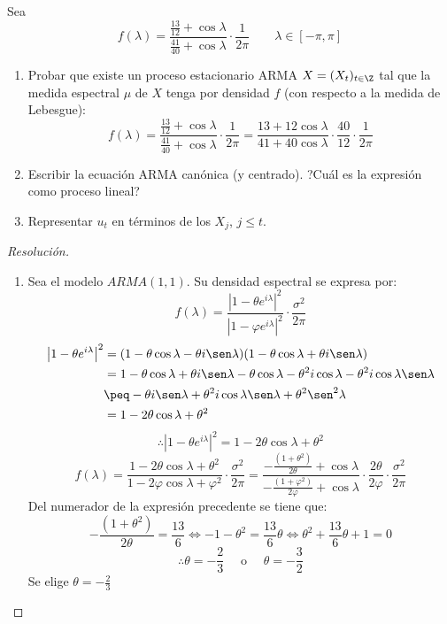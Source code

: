 \begin{ejemplo}
Sea 
\[
 f(\lambda )=\frac{\frac{13}{12}+\cos \lambda }{\frac{41}{40}+\cos 
\lambda }\cdot\frac{1}{2\pi }\qquad \lambda \in \left[ {-\pi ,\pi } 
\right]
\]

\begin{enumerate}
\item Probar que existe un proceso estacionario ARMA $X=(X_{t} )_{t\in \Z} $ tal que la medida espectral $\mu $ de $X$ tenga por densidad $f$ (con respecto a la medida de Lebesgue):
\[
f(\lambda )=\frac{\frac{13}{12}+\cos \lambda }{\frac{41}{40}+\cos \lambda 
}\cdot\frac{1}{2\pi }=\frac{13+12 \cos \lambda }{41+40\cos \lambda }\cdot\frac{40}{12}\cdot\frac{1}{2\pi }
\]

\item Escribir la ecuaci\'{o}n ARMA can\'{o}nica (y centrado). ?Cu\'{a}l es la expresi\'{o}n como proceso lineal?

\item Representar $u_{{t}}$ en t\'{e}rminos de los $X_{j}$, $j\le t$.
\end{enumerate}


\begin{proof}[Resoluci\'{o}n]
\begin{enumerate}
\item Sea el modelo $ARMA(1, 1)$. Su densidad espectral se expresa por:
\[
f(\lambda )=\frac{\left| {1-\theta e^{i\lambda }} \right|^{2}}{\left| 
{1-\varphi e^{i\lambda }} \right|^{2}}\cdot\frac{\sigma^{2}}{2\pi }
\]
\begin{align*}
\left| {1-\theta e^{i\lambda }} \right|^{2}
	&=(1-\theta \cos \lambda -\theta i \sen\lambda )(1-\theta \cos \lambda +\theta i\sen\lambda )\\
	&=1-\theta \cos \lambda +\theta i\sen\lambda -\theta \cos \lambda -\theta^{2}i\cos \lambda -\theta^{2}i\cos \lambda \sen\lambda\\
	&\peq - \theta i\sen\lambda +\theta^{2}i\cos \lambda \sen\lambda +\theta^{2}\sen^{2}\lambda\\
	&=1-2\theta \cos \lambda +\theta^{2}
\end{align*}
\[
\therefore\left| {1-\theta e^{i\lambda }} \right|^{2}=1-2\theta \cos \lambda +\theta 
^{2}
\]
\[
f(\lambda )=\frac{1-2\theta \cos \lambda +\theta^{2}}{1-2\varphi \cos 
\lambda +\varphi^{2}}\cdot\frac{\sigma^{2}}{2\pi }=\frac{-\frac{(1+\theta 
^{2})}{2\theta }+\cos \lambda }{-\frac{(1+\varphi^{2})}{2\varphi }+\cos 
\lambda }\cdot\frac{2\theta }{2\varphi }\cdot\frac{\sigma^{2}}{2\pi }
\]
Del numerador de la expresi\'{o}n precedente se tiene que:
\[
-\frac{(1+\theta^{2})}{2\theta }=\frac{13}{6}\Longleftrightarrow -1-\theta 
^{2}=\frac{13}{6}\theta \Longleftrightarrow \theta^{2}+\frac{13}{6}\theta +1=0
\]
\[
\therefore\theta =-\frac{2}{3}\quad\text{ o }\quad\theta =-\frac{3}{2}
\]
Se elige $\theta =-\frac{2}{3}$ 


\end{enumerate}
\end{proof}
\end{ejemplo}
